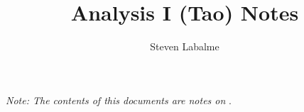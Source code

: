 \documentclass{report}
\title{Analysis I (Tao) Notes}
\author{Steven Labalme}
\begin{document}
\maketitle



\tableofcontents
\thispagestyle{plain}
\bigskip
\emph{Note: The contents of this documents are notes on} \cite{bib:AnalysisI}.
\newpage




\pagestyle{fancy}
\renewcommand{\chaptermark}[1]{\markboth{Chapter \thechapter: #1}{}}
\fancyhf{}
\lhead{\leftmark}





\begin{appendices}
    
\end{appendices}



\end{document}
